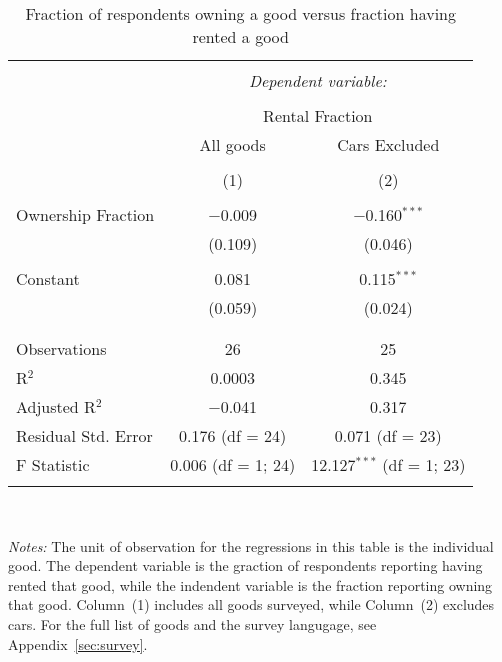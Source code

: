 
\begin{table}[!htbp] \centering 
  \caption{Fraction of respondents owning a good versus fraction having rented a good} 
  \label{tab:own_vs_rent} 
\begin{tabular}{@{\extracolsep{5pt}}lcc} 
\\[-1.8ex]\hline 
\hline \\[-1.8ex] 
 & \multicolumn{2}{c}{\textit{Dependent variable:}} \\ 
\cline{2-3} 
\\[-1.8ex] & \multicolumn{2}{c}{Rental Fraction} \\ 
 & All goods & Cars Excluded \\ 
\\[-1.8ex] & (1) & (2)\\ 
\hline \\[-1.8ex] 
 Ownership Fraction & $-$0.009 & $-$0.160$^{***}$ \\ 
  & (0.109) & (0.046) \\ 
  & & \\ 
 Constant & 0.081 & 0.115$^{***}$ \\ 
  & (0.059) & (0.024) \\ 
  & & \\ 
\hline \\[-1.8ex] 
Observations & 26 & 25 \\ 
R$^{2}$ & 0.0003 & 0.345 \\ 
Adjusted R$^{2}$ & $-$0.041 & 0.317 \\ 
Residual Std. Error & 0.176 (df = 24) & 0.071 (df = 23) \\ 
F Statistic & 0.006 (df = 1; 24) & 12.127$^{***}$ (df = 1; 23) \\ 
\hline 
\hline \\[-1.8ex] 
\end{tabular}
\\{\footnotesize \begin{minipage}{0.75 \linewidth} \emph{Notes:}
The unit of observation for the regressions in this table is the individual good.
The dependent variable is the graction of respondents reporting having rented that good, while the indendent variable is the fraction reporting owning that good. 
Column~(1) includes all goods surveyed, while Column~(2) excludes cars.
For the full list of goods and the survey langugage, see Appendix~\ref{sec:survey}. 
\starlanguage \end{minipage} }
\end{table}
